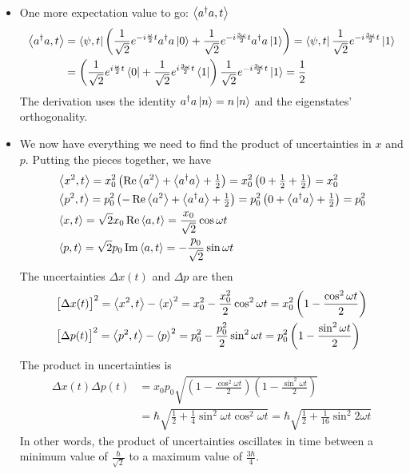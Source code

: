 \documentclass[11pt, a4paper]{article}
\newcommand{\evb}[1]{\big \langle {#1} \big \rangle}  %
\begin{document}
\begin{itemize}
	\item One more expectation value to go: $ \ev{a^{\dagger}a, t} $
	\begin{align*}
		\evb{a^{\dagger}a, t} &=  \bra{\psi, t}\left(\frac{1}{\sqrt{2}}e^{-i\frac{\omega}{2}t}a^{\dagger}a\ket{0} + \frac{1}{\sqrt{2}}e^{-i\frac{3\omega}{2}t}a^{\dagger}a\ket{1} \right) = \bra{\psi, t} \frac{1}{\sqrt{2}}e^{-i\frac{3\omega}{2}t} \ket{1}\\
		&=\left(\frac{1}{\sqrt{2}}e^{i\frac{\omega}{2}t}\bra{0} + \frac{1}{\sqrt{2}}e^{i\frac{3\omega}{2}t}\bra{1}\right)\frac{1}{\sqrt{2}}e^{-i\frac{3\omega}{2}t} \ket{1}  = \frac{1}{2}
	\end{align*}
	The derivation uses the identity $ a^{\dagger}a \ket{n} = n \ket{n} $ and the eigenstates' orthogonality.
	
	\item We now have everything we need to find the product of uncertainties in $ x $ and $ p $. Putting the pieces together, we have
	\begin{align*}
		&\ev{x^{2}, t} =  x_{0}^{2}\left(\Re\ev{a^{2}} + \evb{a^{\dagger}a} + \tfrac{1}{2}\right) = x_{0}^{2}\left(0 + \tfrac{1}{2} + \tfrac{1}{2}\right) = x_{0}^{2}\\
		&\ev{p^{2}, t} = p_{0}^{2}\left(-\Re \ev{a^{2}} + \evb{a^{\dagger}a} + \tfrac{1}{2}\right) = p_{0}^{2}\left(0 + \ev{a^{\dagger}a} + \tfrac{1}{2} \right) = p_{0}^{2}\\
		&\ev{x, t} = \sqrt{2}x_{0}\Re\ev{a, t} = \frac{x_{0}}{\sqrt{2}}\cos \omega t \\
		&\ev{p, t} = \sqrt{2}p_{0}\Im\ev{a, t} = - \frac{p_{0}}{\sqrt{2}}\sin \omega t
	\end{align*}
	The uncertainties $ \Delta x(t) $ and $ \Delta p $ are then
	\begin{align*}
		& \big[\Delta x(t)\big]^{2} = \ev{x^{2}, t} - \ev{x}^{2} = x_{0}^{2} - \frac{x_{0}^{2}}{2}\cos^{2} \omega t = x_{0}^{2}\left(1 - \frac{\cos^{2}\omega t}{2}\right)\\
		& \big[\Delta p(t)\big]^{2} = \ev{p^{2}, t} - \ev{p}^{2} = p_{0}^{2} - \frac{p_{0}^{2}}{2}\sin^{2} \omega t = p_{0}^{2}\left(1 - \frac{\sin^{2}\omega t}{2}\right)
	\end{align*}
	The product in uncertainties is
	\begin{align*}
		\Delta x(t) \Delta p(t) &= x_{0}p_{0} \sqrt{\left(1 - \frac{\cos^{2}\omega t}{2}\right)\left(1 - \frac{\sin^{2}\omega t}{2}\right)}\\
		&=\hbar \sqrt{\frac{1}{2} + \frac{1}{4}\sin^{2}\omega t \cos^{2}\omega t  }  = \hbar \sqrt{\frac{1}{2} +  \frac{1}{16}\sin^{2}2\omega t}
	\end{align*}
	In other words, the product of uncertainties oscillates in time between a minimum value of $ \frac{\hbar}{\sqrt{2}} $ to a maximum value of $ \frac{3\hbar}{4} $. 

\end{itemize}
\end{document}
